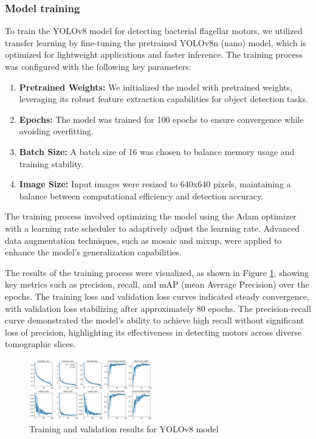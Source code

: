 \documentclass{article}
\begin{document}
\subsubsection{Model training}
To train the YOLOv8 model for detecting bacterial flagellar motors, we utilized transfer learning by fine-tuning the pretrained YOLOv8n (nano) model, which is optimized for lightweight applications and faster inference. The training process was configured with the following key parameters:

\begin{enumerate}
    \item \textbf{Pretrained Weights:} We initialized the model with pretrained weights, leveraging its robust feature extraction capabilities for object detection tasks.
    \item \textbf{Epochs:} The model was trained for 100 epochs to ensure convergence while avoiding overfitting.
    \item \textbf{Batch Size:} A batch size of 16 was chosen to balance memory usage and training stability.
    \item \textbf{Image Size:} Input images were resized to 640x640 pixels, maintaining a balance between computational efficiency and detection accuracy.
\end{enumerate}

The training process involved optimizing the model using the Adam optimizer with a learning rate scheduler to adaptively adjust the learning rate. Advanced data augmentation techniques, such as mosaic and mixup, were applied to enhance the model's generalization capabilities.

The results of the training process were visualized, as shown in Figure \ref{fig:yolo_training_results}, showing key metrics such as precision, recall, and mAP (mean Average Precision) over the epochs. The training loss and validation loss curves indicated steady convergence, with validation loss stabilizing after approximately 80 epochs. The precision-recall curve demonstrated the model's ability to achieve high recall without significant loss of precision, highlighting its effectiveness in detecting motors across diverse tomographic slices.

\begin{figure}[htb]
    \centering
    \includegraphics[width=0.48\textwidth]{images/results.png}
    \caption{Training and validation results for YOLOv8 model}
    \label{fig:yolo_training_results}
\end{figure}
\end{document}
